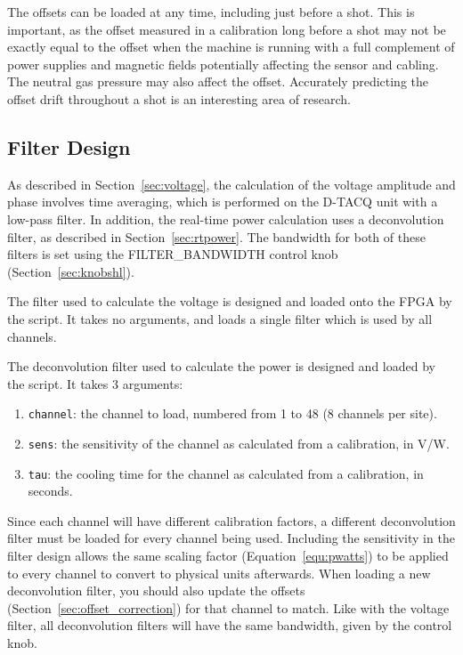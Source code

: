 \documentclass[12pt,a4paper]{article}
\begin{document}
The offsets can be loaded at any time, including just before a shot. This is important, as the offset measured in a calibration long before a shot may not
be exactly equal to the offset when the machine is running with a full complement of power supplies and magnetic fields potentially affecting the sensor
and cabling. The neutral gas pressure may also affect the offset. Accurately predicting the offset drift throughout a shot is an interesting area of
research.

\subsection{Filter Design}
\label{sec:lpfdesign}
As described in Section~\ref{sec:voltage}, the calculation of the voltage amplitude and phase involves time averaging, which is performed on the D-TACQ
unit with a low-pass filter. In addition, the real-time power calculation uses a deconvolution filter, as described in Section~\ref{sec:rtpower}. The
bandwidth for both of these filters is set using the FILTER{\_}BANDWIDTH control knob (Section~\ref{sec:knobshl}).

The filter used to calculate the voltage is designed and loaded onto the FPGA by the \mbox{} script. It takes no
arguments, and loads a single filter which is used by all channels.

The deconvolution filter used to calculate the power is designed and loaded by the \mbox{} script. It takes 3
arguments:
\begin{enumerate}
\item{\texttt{channel}: the channel to load, numbered from 1 to 48 (8 channels per site).}
\item{\texttt{sens}: the sensitivity of the channel as calculated from a calibration, in V/W.}
\item{\texttt{tau}: the cooling time for the channel as calculated from a calibration, in seconds.}
\end{enumerate}
Since each channel will have different calibration factors, a different deconvolution filter must be loaded for every channel being used. Including the
sensitivity in the filter design allows the same scaling factor (Equation~\ref{equ:pwatts}) to be applied to every channel to convert to physical units
afterwards. When loading a new deconvolution filter, you should also update the offsets (Section~\ref{sec:offset_correction}) for that channel to
match. Like with the voltage filter, all deconvolution filters will have the same bandwidth, given by the control knob.
\end{document}
